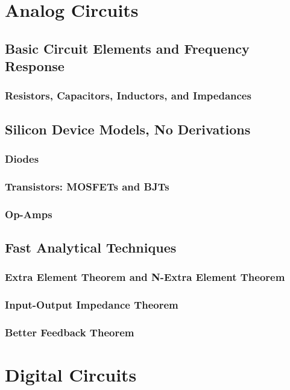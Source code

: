 \documentclass[12pt]{article}
\begin{document}

\newpage
\tableofcontents
\newpage
\section{Analog Circuits}
\subsection{Basic Circuit Elements and Frequency Response}
\subsubsection{Resistors, Capacitors, Inductors, and Impedances}
\subsection{Silicon Device Models, No Derivations}
\subsubsection{Diodes}
\subsubsection{Transistors: MOSFETs and BJTs}
\subsubsection{Op-Amps}
\subsection{Fast Analytical Techniques}
\subsubsection{Extra Element Theorem and N-Extra Element Theorem}
\subsubsection{Input-Output Impedance Theorem}
\subsubsection{Better Feedback Theorem}
\section{Digital Circuits}
\end{document}
